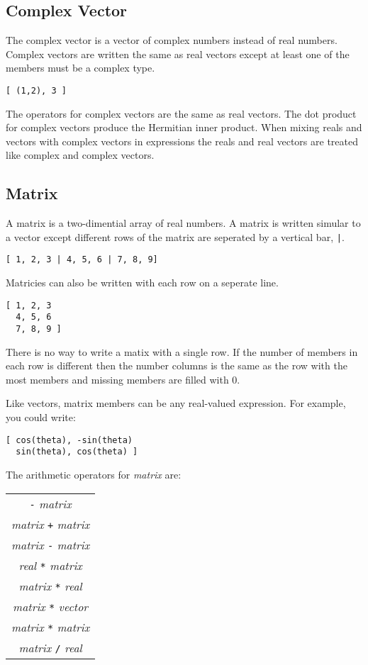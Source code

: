 \documentclass{article}
\begin{document}
\subsection{Complex Vector}
The complex vector is a vector of complex numbers instead of real numbers.
Complex vectors are written the same as real vectors except
at least one of the members must be a complex type.
\begin{verbatim}
[ (1,2), 3 ]
\end{verbatim}

The operators for complex vectors are the same as real vectors.
The dot product for complex vectors produce the Hermitian inner product.
When mixing reals and vectors with complex vectors in expressions the
reals and real vectors are treated like complex and complex vectors.

\subsection{Matrix}
A matrix is a two-dimential array of real numbers.
A matrix is written simular to a vector except different rows of the
matrix are seperated by a vertical bar, \verb$|$.
\begin{verbatim}
[ 1, 2, 3 | 4, 5, 6 | 7, 8, 9]
\end{verbatim}
Matricies can also be written with each row on a seperate line.
\begin{verbatim}
[ 1, 2, 3
  4, 5, 6
  7, 8, 9 ]
\end{verbatim}
There is no way to write a matix with a single row.
If the number of members in each row is different then the number columns is the same as
the row with the most members and missing members are filled with 0.

Like vectors, matrix members can be any real-valued expression.
For example, you could write:
\begin{verbatim}
[ cos(theta), -sin(theta)
  sin(theta), cos(theta) ]
\end{verbatim}

The arithmetic operators for \emph{matrix} are:
\begin{center}
  \begin{tabular}{c}
    \verb|-| \emph{matrix} \\
    \emph{matrix} \verb|+| \emph{matrix} \\
    \emph{matrix} \verb|-| \emph{matrix} \\
    \emph{real} \verb|*| \emph{matrix} \\
    \emph{matrix} \verb|*| \emph{real} \\
    \emph{matrix} \verb|*| \emph{vector} \\
    \emph{matrix} \verb|*| \emph{matrix} \\
    \emph{matrix} \verb|/| \emph{real} \\
  \end{tabular}
\end{center}
\end{document}
